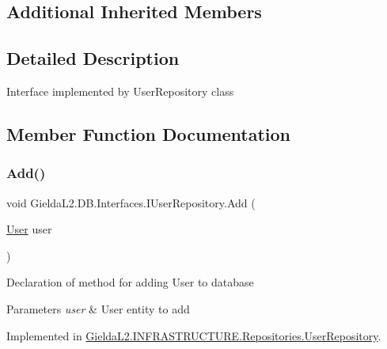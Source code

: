 \subsection*{Additional Inherited Members}


\subsection{Detailed Description}
Interface implemented by User\+Repository class 



\subsection{Member Function Documentation}
\mbox{\label{interface_gielda_l2_1_1_d_b_1_1_interfaces_1_1_i_user_repository_afd1f24172cd7dd824feb7d1d67ff9475}} 
\subsubsection{\texorpdfstring{Add()}{Add()}}
{\footnotesize\ttfamily void Gielda\+L2.\+D\+B.\+Interfaces.\+I\+User\+Repository.\+Add (\begin{DoxyParamCaption}\item[{\mbox{\hyperlink{class_gielda_l2_1_1_d_b_1_1_entities_1_1_user}{User}}}]{user }\end{DoxyParamCaption})}



Declaration of method for adding User to database 


\begin{DoxyParams}{Parameters}
{\em user} & User entity to add\\
\hline
\end{DoxyParams}


Implemented in \mbox{\hyperlink{class_gielda_l2_1_1_i_n_f_r_a_s_t_r_u_c_t_u_r_e_1_1_repositories_1_1_user_repository_a686490e4e59fb25b843d11bab137ec56}{Gielda\+L2.\+I\+N\+F\+R\+A\+S\+T\+R\+U\+C\+T\+U\+R\+E.\+Repositories.\+User\+Repository}}.

\mbox{\label{interface_gielda_l2_1_1_d_b_1_1_interfaces_1_1_i_user_repository_a65d2dc63fea742354209b2e13a15a452}} 
